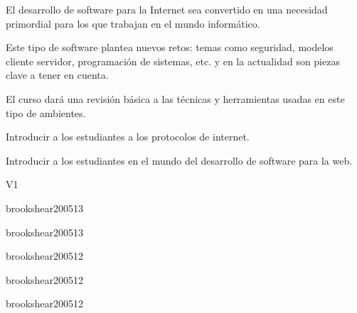 \begin{syllabus}


\begin{justification}
El desarrollo de software para la Internet sea convertido en una necesidad primordial para los que trabajan en el mundo informático.

Este tipo de software plantea nuevos retos: temas como seguridad, modelos cliente servidor, programación de sistemas, etc. y en la actualidad son piezas clave a tener en cuenta.

El curso dará una revisión básica a las técnicas y herramientas usadas en este tipo de ambientes.
\end{justification}

\begin{goals}
\item Introducir a los estudiantes a los protocolos de internet.
\item Introducir a los estudiantes en el mundo del desarrollo de software para la web.
\end{goals}

\begin{outcomes}{V1}
\end{outcomes}

\begin{unit}{\NCIntroductionDef}{}{brookshear2005}{1}{3}
   \NCIntroductionAllTopics
   \NCIntroductionAllObjectives
\end{unit}

\begin{unit}{\NCNetworkCommunicationDef}{}{brookshear2005}{1}{3}
   \NCNetworkCommunicationAllTopics
   \NCNetworkCommunicationAllObjectives
\end{unit}

\begin{unit}{\NCNetworkSecurityDef}{}{brookshear2005}{1}{2}
   \NCNetworkSecurityAllTopics
   \NCNetworkSecurityAllObjectives
\end{unit}

\begin{unit}{\NCCompressionDef}{}{brookshear2005}{1}{2}
   \NCCompressionAllTopics
   \NCCompressionAllObjectives
\end{unit}

\begin{unit}{\NCNetworkManagementDef}{}{brookshear2005}{1}{2}
   \NCNetworkManagementAllTopics
   \NCNetworkManagementAllObjectives
\end{unit}


\end{syllabus}
